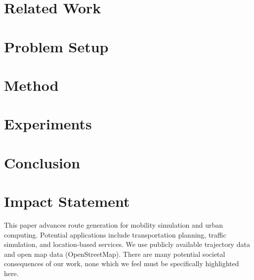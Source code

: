 \documentclass{article}
\theoremstyle{plain}
\theoremstyle{definition}
\theoremstyle{remark}
\begin{document}
\section{Related Work}


\section{Problem Setup}
\label{sec:problem-setup}


\section{Method}
\label{sec:method}


\section{Experiments}
\label{sec:experiments}


\section{Conclusion}


\section*{Impact Statement}

This paper advances route generation for mobility simulation and urban computing.
Potential applications include transportation planning, traffic simulation, and location-based services.
We use publicly available trajectory data and open map data (OpenStreetMap).
There are many potential societal consequences of our work, none which we feel must be specifically highlighted here.
\end{document}
